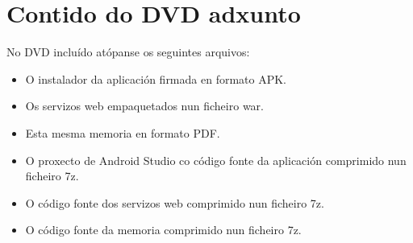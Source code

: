 \chapter{Contido do DVD adxunto}

No DVD incluído atópanse os seguintes arquivos:

\begin{itemize}
	\item O instalador da aplicación firmada en formato APK.
	\item Os servizos web empaquetados nun ficheiro war.
	\item Esta mesma memoria en formato PDF.
	\item O proxecto de Android Studio co código fonte da aplicación comprimido nun ficheiro 7z.
	\item O código fonte dos servizos web comprimido nun ficheiro 7z.
	\item O código fonte da memoria comprimido nun ficheiro 7z.
\end{itemize}